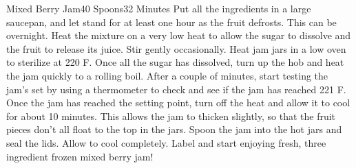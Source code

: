 \documentclass[../cookbook.tex]{subfiles}
\begin{document}
\begin{recipe}{Mixed Berry Jam}{40 Spoons}{32 Minutes}
    Put all the ingredients in a large saucepan, and let stand for at least one
    hour as the fruit defrosts. This can be overnight. Heat the mixture on a
    very low heat to allow the sugar to dissolve and the fruit to release its
    juice. Stir gently occasionally. Heat jam jars in a low oven to sterilize at
    220 \degrees{}F. Once all the sugar has dissolved, turn up the hob and heat
    the jam quickly to a rolling boil. After a couple of minutes, start testing
    the jam's set by using a thermometer to check and see if the jam has reached
    221 \degrees{}F. Once the jam has reached the setting point, turn off the heat
    and allow it to cool for about 10 minutes. This allows the jam to thicken
    slightly, so that the fruit pieces don't all float to the top in the jars.
    Spoon the jam into the hot jars and seal the lids. Allow to cool completely.
    Label and start enjoying fresh, three ingredient frozen mixed berry jam!
    
\end{recipe}
\end{document}

